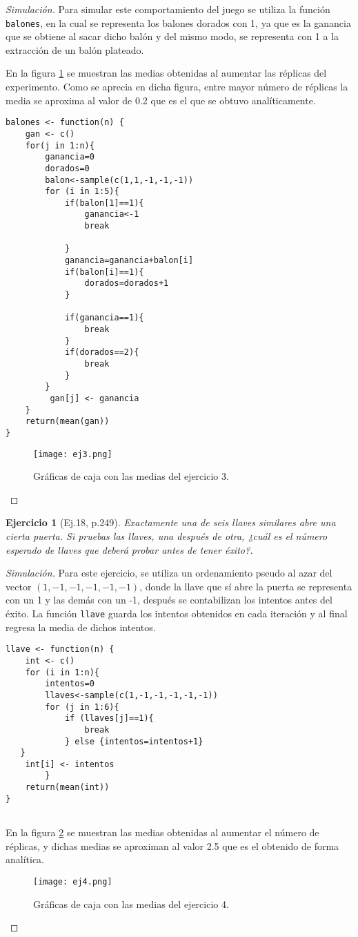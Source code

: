 \documentclass[12pt,letterpaper]{article}
\newtheorem{ej}{Ejercicio}
\begin{document}
\begin{proof}[Simulación] 
Para simular este comportamiento del juego se utiliza la función \texttt{balones}, en la cual se representa los balones dorados con 1, ya que es la ganancia que se obtiene al sacar dicho balón y del mismo modo, se representa con 1 a la extracción de un balón plateado.

En la figura \ref{ej3} se muestran las medias obtenidas al aumentar las réplicas del experimento. Como se aprecia en dicha figura, entre mayor número de réplicas la media se aproxima al valor de 0.2 que es el que se obtuvo analíticamente.
\begin{lstlisting}
balones <- function(n) {
    gan <- c() 
    for(j in 1:n){
        ganancia=0
        dorados=0
        balon<-sample(c(1,1,-1,-1,-1))
        for (i in 1:5){
            if(balon[1]==1){
                ganancia<-1
                break

            }
            ganancia=ganancia+balon[i]
            if(balon[i]==1){
                dorados=dorados+1
            }

            if(ganancia==1){
                break
            }
            if(dorados==2){
                break
            }
        }
         gan[j] <- ganancia 
    }
    return(mean(gan))
}
\end{lstlisting}
\begin{figure}
 	\centering 
 		\texttt{[image: ej3.png]} 		
 	 	\caption{Gráficas de caja con las medias del ejercicio 3.} 
 	 		\label{ej3}
\end{figure}
\end{proof}
\begin{ej}[Ej.18, p.249]
Exactamente una de seis llaves similares abre una cierta puerta. Si pruebas las llaves, una después de otra, ¿cuál es el número esperado de llaves que deberá probar antes de tener éxito?.
\end{ej}
\begin{proof}[Simulación] 
Para este ejercicio, se utiliza un ordenamiento pseudo al azar del vector $(1,-1,-1,-1,-1,-1)$, donde la llave que sí abre la puerta se representa con un 1 y las demás con un -1, después se contabilizan los intentos antes del éxito. La función \texttt{llave} guarda los intentos obtenidos en cada iteración y al final regresa la media de dichos intentos. 
\begin{lstlisting}
llave <- function(n) {
    int <- c()
    for (i in 1:n){
        intentos=0
        llaves<-sample(c(1,-1,-1,-1,-1,-1))
        for (j in 1:6){
            if (llaves[j]==1){
                break
            } else {intentos=intentos+1}
   }
    int[i] <- intentos    
        }
    return(mean(int))
}


\end{lstlisting}
En la figura \ref{ej4} se muestran las medias obtenidas al aumentar el número de réplicas, y dichas medias se aproximan al valor 2.5 que es el obtenido de forma analítica. 
\begin{figure}
 	\centering 
 		\texttt{[image: ej4.png]} 		
 	 	\caption{Gráficas de caja con las medias del ejercicio 4.} 
 	 		\label{ej4}
\end{figure}
\end{proof}
\end{document}
